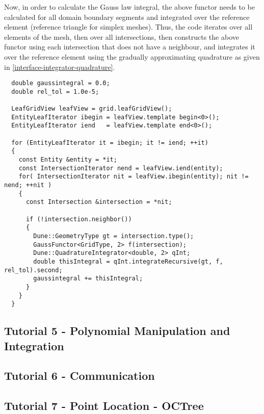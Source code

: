 \noindent
Now, in order to calculate the Gauss law integral, the above functor needs to be calculated for all domain boundary segments and integrated over the reference element (reference triangle for simplex meshes). Thus, the code iterates over all elements of the mesh, then over all intersections, then constructs the above functor using each intersection that does not have a neighbour, and integrates it over the reference element using the gradually approximating quadrature as given in \ref{interface-integrator-quadrature}. \\

\begin{mybox}
\begin{lstlisting}
  double gaussintegral = 0.0;
  double rel_tol = 1.0e-5;

  LeafGridView leafView = grid.leafGridView();
  EntityLeafIterator ibegin = leafView.template begin<0>();
  EntityLeafIterator iend   = leafView.template end<0>();

  for (EntityLeafIterator it = ibegin; it != iend; ++it)
  {
    const Entity &entity = *it;
    const IntersectionIterator nend = leafView.iend(entity);
    for( IntersectionIterator nit = leafView.ibegin(entity); nit != nend; ++nit )
    {
      const Intersection &intersection = *nit;

      if (!intersection.neighbor())
      {
        Dune::GeometryType gt = intersection.type();
        GaussFunctor<GridType, 2> f(intersection);
        Dune::QuadratureIntegrator<double, 2> qInt;
        double thisIntegral = qInt.integrateRecursive(gt, f, rel_tol).second;
        gaussintegral += thisIntegral;
      }
    }
  }
\end{lstlisting}
\end{mybox}






\subsection{Tutorial 5 - Polynomial Manipulation and Integration}
\label{usage-howto-tutorial-polynomial}

\subsection{Tutorial 6 - Communication}
\label{usage-howto-tutorial-communication}


\subsection{Tutorial 7 - Point Location - OCTree}
\label{usage-howto-tutorial-octree}










